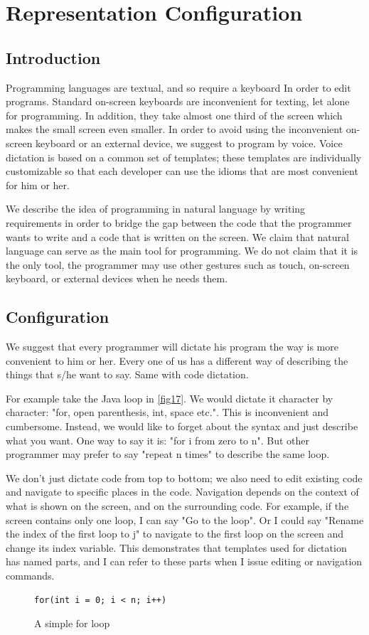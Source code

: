 \chapter{Representation Configuration} \label{chapter:Representation Configuration}
\section{Introduction}
Programming languages are textual, and so require a keyboard In order to edit programs. Standard on-screen keyboards are inconvenient for texting, let alone for programming. In addition, they take almost one third of the screen which makes the small screen even smaller. In order to avoid using the inconvenient on-screen keyboard or an external device, we suggest to program by voice. Voice dictation is based on a common set of templates; these templates are individually customizable so that each developer can use the idioms that are most convenient for him or her.

We describe the idea of programming in natural language by writing requirements in order to bridge the gap between the code that the programmer wants to write and a code that is written on the screen. We claim that natural language can serve as the main tool for programming. We do not claim that it is the only tool, the programmer may use other gestures such as touch, on-screen keyboard, or external devices when he needs them.

\section{Configuration}
We suggest that every programmer will dictate his program the way is more convenient to him or her. Every one of us has a different way of describing the things that s/he want to say. Same with code dictation.

For example take the Java loop in \autoref{fig17}. We would dictate it character by character: "for, open parenthesis, int, space etc.". This is inconvenient and cumbersome. Instead, we would like to forget about the syntax and just describe what you want. One way to say it is: "for i from zero to n". But other programmer may prefer to say "repeat n times" to describe the same loop.

We don't just dictate code from top to bottom; we also need to edit existing code and navigate to specific places in the code. Navigation depends on the context of what is shown on the screen, and on the surrounding code. For example, if the screen contains only one loop, I can say "Go to the loop". Or I could say "Rename the index of the first loop to j" to navigate to the first loop on the screen and change its index variable. This demonstrates that templates used for dictation has named parts, and I can refer to these parts when I issue editing or navigation commands.
\begin{figure}[H]
\begin{lstlisting}
for(int i = 0; i < n; i++)
\end{lstlisting}
\caption{A simple for loop}
\label{fig17}
\end{figure}
